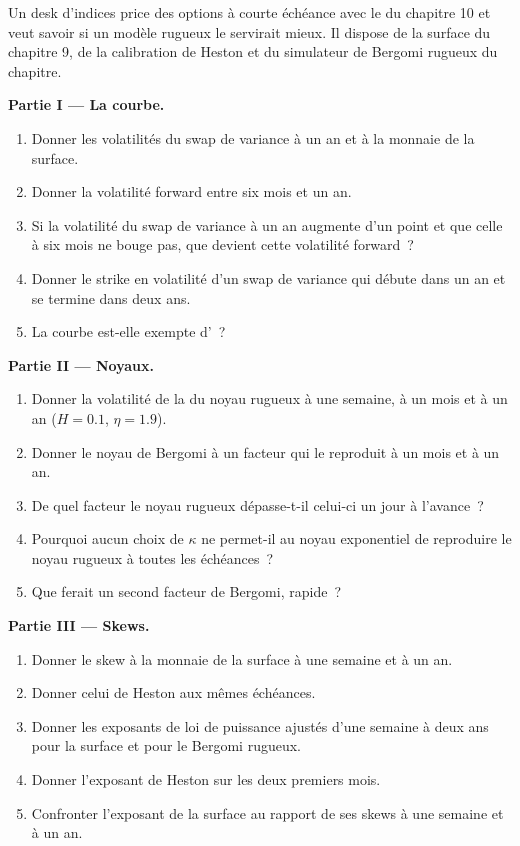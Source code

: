 \begin{problem}\label{pb:dv:rough-volatility-and-forward-variance-models:1}
Un desk d'indices price des options à courte échéance avec le  du chapitre 10 et veut savoir si un modèle
rugueux le servirait mieux. Il dispose de la surface du chapitre 9, de la calibration de Heston et du
simulateur de Bergomi rugueux du chapitre.

\medskip\noindent\textbf{Partie I --- La courbe.}
\begin{enumerate}
\item Donner les volatilités du swap de variance à un an et à la monnaie de la surface.
\item Donner la volatilité forward entre six mois et un an.
\item Si la volatilité du swap de variance à un an augmente d'un point et que celle à six mois ne bouge pas, que
devient cette volatilité forward~?
\item Donner le strike en volatilité d'un swap de variance qui débute dans un an et se termine dans deux ans.
\item La courbe est-elle exempte d'~?
\end{enumerate}

\medskip\noindent\textbf{Partie II --- Noyaux.}
\begin{enumerate}[resume]
\item Donner la volatilité de la  du noyau rugueux à une semaine, à un mois et à un an ($H=0.1$,
$\eta=1.9$).
\item Donner le noyau de Bergomi à un facteur qui le reproduit à un mois et à un an.
\item De quel facteur le noyau rugueux dépasse-t-il celui-ci un jour à l'avance~?
\item Pourquoi aucun choix de $\kappa$ ne permet-il au noyau exponentiel de reproduire le noyau rugueux à toutes les échéances~?
\item Que ferait un second facteur de Bergomi, rapide~?
\end{enumerate}

\medskip\noindent\textbf{Partie III --- Skews.}
\begin{enumerate}[resume]
\item Donner le skew à la monnaie de la surface à une semaine et à un an.
\item Donner celui de Heston aux mêmes échéances.
\item Donner les exposants de loi de puissance ajustés d'une semaine à deux ans pour la surface et pour le Bergomi rugueux.
\item Donner l'exposant de Heston sur les deux premiers mois.
\item Confronter l'exposant de la surface au rapport de ses skews à une semaine et à un an.
\end{enumerate}


\end{problem}
